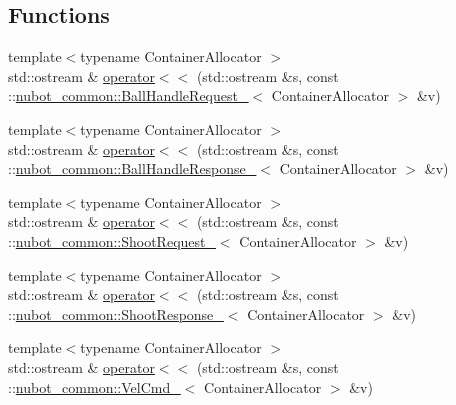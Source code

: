 \subsection*{Functions}
\begin{DoxyCompactItemize}
\item 
{\footnotesize template$<$typename Container\-Allocator $>$ }\\std\-::ostream \& \hyperlink{namespacenubot__common_add603828c798fa7f644ca35454e0c6a0}{operator$<$$<$} (std\-::ostream \&s, const \-::\hyperlink{structnubot__common_1_1BallHandleRequest__}{nubot\-\_\-common\-::\-Ball\-Handle\-Request\-\_\-}$<$ Container\-Allocator $>$ \&v)
\item 
{\footnotesize template$<$typename Container\-Allocator $>$ }\\std\-::ostream \& \hyperlink{namespacenubot__common_a28a21c33d8ec4a6872fff2625d96a062}{operator$<$$<$} (std\-::ostream \&s, const \-::\hyperlink{structnubot__common_1_1BallHandleResponse__}{nubot\-\_\-common\-::\-Ball\-Handle\-Response\-\_\-}$<$ Container\-Allocator $>$ \&v)
\item 
{\footnotesize template$<$typename Container\-Allocator $>$ }\\std\-::ostream \& \hyperlink{namespacenubot__common_a7704a9d41008a8394e0ac278266d96fd}{operator$<$$<$} (std\-::ostream \&s, const \-::\hyperlink{structnubot__common_1_1ShootRequest__}{nubot\-\_\-common\-::\-Shoot\-Request\-\_\-}$<$ Container\-Allocator $>$ \&v)
\item 
{\footnotesize template$<$typename Container\-Allocator $>$ }\\std\-::ostream \& \hyperlink{namespacenubot__common_abbc768c78a97a2d0652c33b849968b6e}{operator$<$$<$} (std\-::ostream \&s, const \-::\hyperlink{structnubot__common_1_1ShootResponse__}{nubot\-\_\-common\-::\-Shoot\-Response\-\_\-}$<$ Container\-Allocator $>$ \&v)
\item 
{\footnotesize template$<$typename Container\-Allocator $>$ }\\std\-::ostream \& \hyperlink{namespacenubot__common_abef75310125e6646bcfb56cd23c2f2a4}{operator$<$$<$} (std\-::ostream \&s, const \-::\hyperlink{structnubot__common_1_1VelCmd__}{nubot\-\_\-common\-::\-Vel\-Cmd\-\_\-}$<$ Container\-Allocator $>$ \&v)
\end{DoxyCompactItemize}


